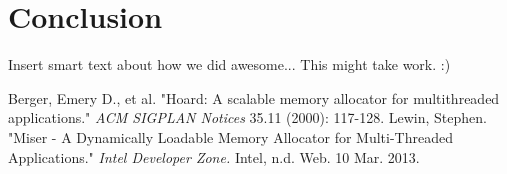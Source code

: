 \documentclass{article}
\begin{document}
\newpage
\section{Conclusion}

Insert smart text about how we did awesome... This might take work. :)

\newpage

\begin{thebibliography}{9}
	
		Berger, Emery D., et al.
		"Hoard: A scalable memory allocator for multithreaded applications."
		\textit{ACM SIGPLAN Notices} 35.11 
		(2000): 
		117-128.
		Lewin, Stephen.
		"Miser - A Dynamically Loadable Memory Allocator for Multi-Threaded Applications."
		\textit{Intel Developer Zone.}
		Intel, 
		n.d. Web. 10 Mar. 2013.

\end{thebibliography}
\end{document}
